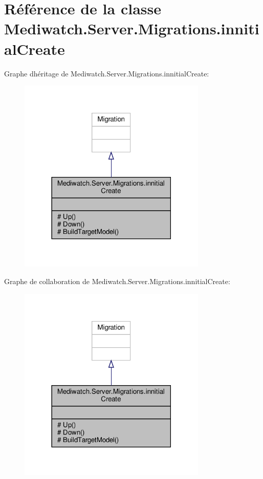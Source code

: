 \hypertarget{class_mediwatch_1_1_server_1_1_migrations_1_1innitial_create}{}\section{Référence de la classe Mediwatch.\+Server.\+Migrations.\+innitial\+Create}
\label{class_mediwatch_1_1_server_1_1_migrations_1_1innitial_create}


Graphe d\textquotesingle{}héritage de Mediwatch.\+Server.\+Migrations.\+innitial\+Create\+:
\nopagebreak
\begin{figure}[H]
\begin{center}
\leavevmode
\includegraphics[width=254pt]{class_mediwatch_1_1_server_1_1_migrations_1_1innitial_create__inherit__graph}
\end{center}
\end{figure}


Graphe de collaboration de Mediwatch.\+Server.\+Migrations.\+innitial\+Create\+:
\nopagebreak
\begin{figure}[H]
\begin{center}
\leavevmode
\includegraphics[width=254pt]{class_mediwatch_1_1_server_1_1_migrations_1_1innitial_create__coll__graph}
\end{center}
\end{figure}
